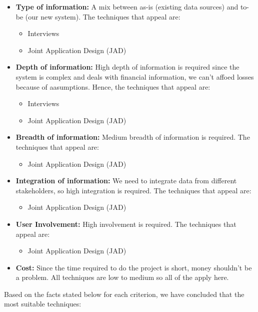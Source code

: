 \documentclass[a4paper]{report}
\begin{document}
\begin{itemize}
    \item \textbf{Type of information:} A mix between as-is (existing data sources) and to-be (our new system). The techniques that appeal are:
          \begin{itemize}
              \item Interviews
              \item Joint Application Design (JAD)
          \end{itemize}
    \item \textbf{Depth of information:} High depth of information is required since the system is complex and deals with financial information, we can't affoed losses because of aasumptions. Hence, the techniques that appeal are:
          \begin{itemize}
              \item Interviews
              \item Joint Application Design (JAD)
          \end{itemize}
    \item \textbf{Breadth of information:} Medium breadth of information is required. The techniques that appeal are:
          \begin{itemize}
              \item Joint Application Design (JAD)
          \end{itemize}
    \item \textbf{Integration of information:} We need to integrate data from different stakeholders, so high integration is required. The techniques that appeal are:
          \begin{itemize}
              \item Joint Application Design (JAD)
          \end{itemize}
    \item \textbf{User Involvement:} High involvement is required. The techniques that appeal are:
          \begin{itemize}
              \item Joint Application Design (JAD)
          \end{itemize}
    \item \textbf{Cost:} Since the time required to do the project is short, money shouldn't be a problem. All techniques are low to medium so all of the apply here.
\end{itemize}

Based on the facts stated below for each criterion, we have concluded that the most suitable techniques:
\end{document}
